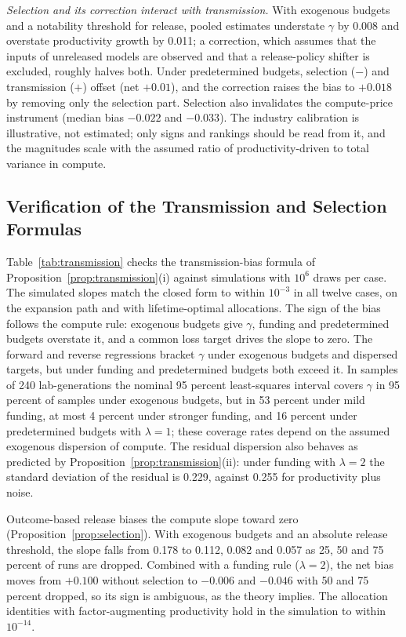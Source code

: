 \documentclass[AER,finalmode]{AEA}
\theoremstyle{definition}
\theoremstyle{remark}
\begin{document}
\textit{Selection and its correction interact with transmission.} With exogenous budgets and a notability threshold
for release, pooled estimates understate $\gamma$ by 0.008 and overstate productivity growth by 0.011; a
\citet{heckman1979sample} correction, which assumes that the inputs of unreleased models are observed and that a
release-policy shifter is excluded, roughly halves both. Under predetermined budgets, selection ($-$) and
transmission ($+$) offset (net $+0.01$), and the correction raises the bias to $+0.018$ by removing only the selection
part. Selection also invalidates the compute-price instrument (median bias $-0.022$ and $-0.033$). The industry
calibration is illustrative, not estimated; only signs and rankings should be read from it, and the magnitudes scale
with the assumed ratio of productivity-driven to total variance in compute.



\subsection{Verification of the Transmission and Selection Formulas}\label{app:mc-formulas}

Table~\ref{tab:transmission} checks the transmission-bias formula of Proposition~\ref{prop:transmission}(i) against
simulations with $10^6$ draws per case. The simulated slopes match the closed form to within $10^{-3}$ in all twelve
cases, on the expansion path and with lifetime-optimal allocations. The sign of the bias follows the compute rule:
exogenous budgets give $\gamma$, funding and predetermined budgets overstate it, and a common loss target drives the
slope to zero. The forward and reverse regressions bracket $\gamma$ under exogenous budgets and dispersed targets, but
under funding and predetermined budgets both exceed it. In samples of 240 lab-generations the nominal 95 percent
least-squares interval covers $\gamma$ in 95 percent of samples under exogenous budgets, but in 53 percent under mild
funding, at most 4 percent under stronger funding, and 16 percent under predetermined budgets with $\lambda=1$; these
coverage rates depend on the assumed exogenous dispersion of compute. The residual dispersion also behaves as predicted
by Proposition~\ref{prop:transmission}(ii): under funding with $\lambda=2$ the standard deviation of the residual is
0.229, against 0.255 for productivity plus noise.

Outcome-based release biases the compute slope toward zero (Proposition~\ref{prop:selection}). With exogenous budgets
and an absolute release threshold, the slope falls from 0.178 to 0.112, 0.082 and 0.057 as 25, 50 and 75 percent of
runs are dropped. Combined with a funding rule ($\lambda=2$), the net bias moves from $+0.100$ without selection to
$-0.006$ and $-0.046$ with 50 and 75 percent dropped, so its sign is ambiguous, as the theory implies. The allocation
identities with factor-augmenting productivity hold in the simulation to within $10^{-14}$.
\end{document}
